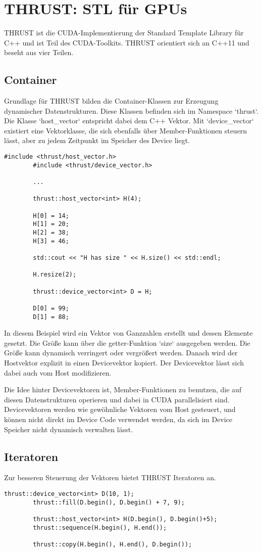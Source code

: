 	\section{THRUST: STL f\"ur GPUs}
	THRUST ist die CUDA-Implementierung der Standard Template Library für C++ und ist Teil des CUDA-Toolkits. THRUST orientiert sich an C++11 und beseht aus vier Teilen.
		
		\subsection{Container}
		Grundlage für THRUST bilden die Container-Klassen zur Erzeugung dynamischer Datenstrukturen. Diese Klassen befinden sich im Namespace \li`thrust`. Die Klasse \li`host_vector` entspricht dabei dem C++ Vektor. Mit \li`device_vector` existiert eine Vektorklasse, die sich ebenfalls über Member-Funktionen steuern lässt, aber zu jedem Zeitpunkt im Speicher des Device liegt.
		\begin{lstlisting}[caption=THRUST Vektoren]
		#include <thrust/host_vector.h>
		#include <thrust/device_vector.h>

		...

		thrust::host_vector<int> H(4);

		H[0] = 14;
		H[1] = 20;
		H[2] = 38;
		H[3] = 46;

		std::cout << "H has size " << H.size() << std::endl;

		H.resize(2);

		thrust::device_vector<int> D = H;

		D[0] = 99;
		D[1] = 88;
		\end{lstlisting}
		
		In diesem Beispiel wird ein Vektor von Ganzzahlen erstellt und dessen Elemente gesetzt. Die Größe kann über die getter-Funktion \li`size` ausgegeben werden. Die Größe kann dynamisch verringert oder vergrößert werden. Danach wird der Hostvektor explizit in einen Devicevektor kopiert. Der Devicevektor lässt sich dabei auch vom Host modifizieren.
		
		Die Idee hinter Devicevektoren ist, Member-Funktionen zu benutzen, die auf diesen Datenstrukturen operieren und dabei in CUDA parallelisiert sind. Devicevektoren werden wie gewöhnliche Vektoren vom Host gesteuert, und können nicht direkt im Device Code verwendet werden, da sich im Device Speicher nicht dynamisch verwalten lässt.
		
		\subsection{Iteratoren}
		Zur besseren Steuerung der Vektoren bietet THRUST Iteratoren an.
		\begin{lstlisting}[caption=THRUST Iteratoren]
		thrust::device_vector<int> D(10, 1);
		thrust::fill(D.begin(), D.begin() + 7, 9);
		
		thrust::host_vector<int> H(D.begin(), D.begin()+5);
		thrust::sequence(H.begin(), H.end());
		
		thrust::copy(H.begin(), H.end(), D.begin());
		\end{lstlisting}
		
